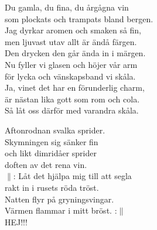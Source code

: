 \documentclass[a6paper, 10pt, twoside]{article}
\begin{document}
\noindent
\begin{center}
\end{center}
\begin{lyrics}
Du gamla, du fina, du årgågna vin\\
som plockats och trampats bland bergen.\\
Jag dyrkar aromen och smaken så fin,\\
men ljuvast utav allt är ändå färgen.\\
Den drycken den går ända in i märgen.
\vspace{5pt}\\
Nu fyller vi glasen och höjer vår arm\\
för lycka och vänskapsband vi skåla.\\
Ja, vinet det har en förunderlig charm,\\
är nästan lika gott som rom och cola.\\
Så låt oss därför med varandra skåla.
\end{lyrics}
\vspace{40pt}
\begin{center}
\end{center}
\begin{lyrics}
Aftonrodnan svalka sprider.\\
Skymningen sig sänker fin\\
och likt dimridåer sprider\\
doften av det rena vin.
\vspace{5pt}\\
$\|$: Låt det hjälpa mig till att segla\\
rakt in i rusets röda tröst.\\
Natten flyr på gryningsvingar.\\
Värmen flammar i mitt bröst. :$\|$\\
HEJ!!!
\end{lyrics}
\end{document}
